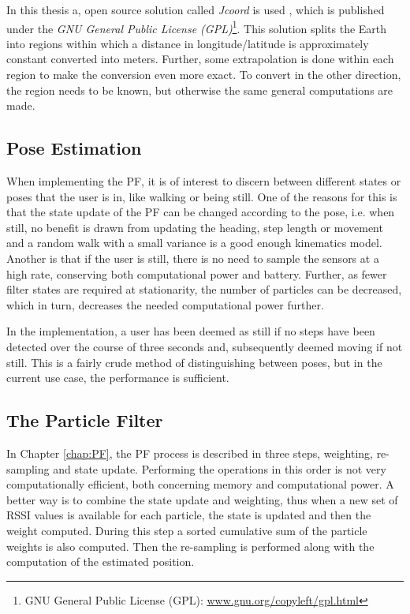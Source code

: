 \documentclass{LTHthesis}
\begin{document}
In this thesis a, open source solution called \emph{Jcoord} is used \cite{jcoord}, which is published under the \emph{GNU General Public License (GPL)}\footnote{GNU General Public License (GPL): \url{www.gnu.org/copyleft/gpl.html}}. This solution splits the Earth into regions within which a distance in longitude/latitude is approximately constant converted into meters. Further, some extrapolation is done within each region to make the conversion even more exact. To convert in the other direction, the region needs to be known, but otherwise the same general computations are made.   
%
\subsection{Pose Estimation}
%
When implementing the PF, it is of interest to discern between different states or poses that the user is in, like walking or being still. One of the reasons for this is that the state update of the PF can be changed according to the pose, i.e. when still, no benefit is drawn from updating the heading, step length or movement and a random walk with a small variance is a good enough kinematics model. Another is that if the user is still, there is no need to sample the sensors at a high rate, conserving both computational power and battery. Further, as fewer filter states are required at stationarity, the number of particles can be decreased, which in turn, decreases the needed computational power further. 

In the implementation, a user has been deemed as still if no steps have been detected over the course of three seconds and, subsequently deemed moving if not still. This is a fairly crude method of distinguishing between poses, but in the current use case, the performance is sufficient.  
%
\subsection{The Particle Filter}
%
In Chapter \ref{chap:PF}, the PF process is described in three steps, weighting, re-sampling and state update. Performing the operations in this order is not very computationally efficient, both concerning memory and computational power. A better way is to combine the state update and weighting, thus when a new set of RSSI values is available for each particle, the state is updated and then the weight computed. During this step a sorted cumulative sum of the particle weights is also computed. Then the re-sampling is performed along with the computation of the estimated position.
\end{document}

